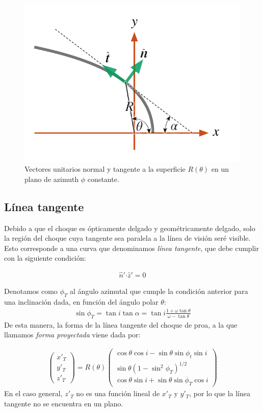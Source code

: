 \begin{figure}
  \includegraphics[width=0.6\linewidth]{./Figures/bowshock-unit-vectors}
  \caption{Vectores unitarios normal y tangente a la superficie $R(\theta)$
    en un plano de azimuth $\phi$ constante.}
    \label{fig:unit-vec}
\end{figure}


\subsection{Línea tangente}
\label{sec:tangent-line}
Debido a que el choque es ópticamente delgado y geométricamente
delgado, solo la región del choque cuya tangente sea paralela a la
línea de visión seré visible. Esto corresponde a una curva que
denominamos \textit{línea tangente}, que debe cumplir con la siguiente
condición:

\begin{align}
  \hat{n}'\boldsymbol{\cdot} \hat{z}' = 0
\end{align}

Denotamos como $\phi_T$ al ángulo azimutal que cumple la condición anterior
para una inclinación dada, en función del ángulo polar $\theta$:
\begin{align}
  \sin\phi_T = \tan i\tan\alpha = \tan i\frac{1+\omega\tan\theta}{\omega-\tan\theta}
  \label{eq:phi-tan}
\end{align}
De esta manera, la forma de la línea tangente del choque de proa, a la que llamamos
\textit{forma proyectada} viene dada por:

\begin{align}
  \left(
  \begin{array}{c}
    x'_T \\
    y'_T \\
    z'_T
  \end{array}
  \right) =
  R(\theta)\left(
  \begin{array}{c}
    \cos\theta\cos i - \sin\theta\sin\phi_t\sin i \\
    \sin\theta\left(1-\sin^2\phi_T\right)^{1/2} \\
    \cos\theta\sin i + \sin\theta\sin\phi_T\cos i
  \end{array}
  \right) \label{eq:proj-shape}
\end{align}
En el caso general, $z'_T$ no es una función lineal de $x'_T$ y $y'_T$, por lo que
la línea tangente no se encuentra en un plano.

